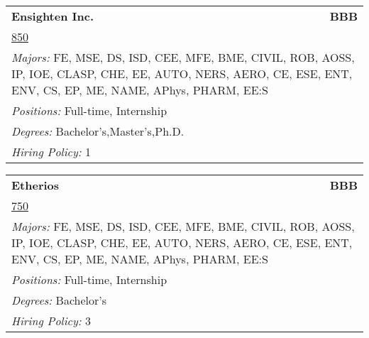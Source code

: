 \documentclass[twoside]{article}
\begin{document}
\begin{center}
\begin{multicols}{3}
\begin{FlushLeft}
\begin{minipage}{.9\columnwidth}
\end{minipage}
 
\begin{minipage}{.9\columnwidth}\begin{tabularx}{.95\columnwidth}{Xr}
                 {\Large\bf Ensighten Inc.} & {\Large\bf BBB}\\
    \multicolumn{2}{p{.95\columnwidth}}{\url{850}}\\
    \multicolumn{2}{p{.95\columnwidth}}{\emph{Majors:} FE, MSE, DS, ISD, CEE, MFE, BME, CIVIL, ROB, AOSS, IP, IOE, CLASP, CHE, EE, AUTO, NERS, AERO, CE, ESE, ENT, ENV, CS, EP, ME, NAME, APhys, PHARM, EE:S}\\
    \multicolumn{2}{p{.95\columnwidth}}{\emph{Positions:} Full-time, Internship}\\
    \multicolumn{2}{p{.95\columnwidth}}{\emph{Degrees:} Bachelor's,Master's,Ph.D.}\\
    \multicolumn{2}{p{.95\columnwidth}}{\emph{Hiring Policy:} 1}\\
    \end{tabularx}
    
\end{minipage}
 
\begin{minipage}{.9\columnwidth}\begin{tabularx}{.95\columnwidth}{Xr}
                 {\Large\bf Etherios} & {\Large\bf BBB}\\
    \multicolumn{2}{p{.95\columnwidth}}{\url{750}}\\
    \multicolumn{2}{p{.95\columnwidth}}{\emph{Majors:} FE, MSE, DS, ISD, CEE, MFE, BME, CIVIL, ROB, AOSS, IP, IOE, CLASP, CHE, EE, AUTO, NERS, AERO, CE, ESE, ENT, ENV, CS, EP, ME, NAME, APhys, PHARM, EE:S}\\
    \multicolumn{2}{p{.95\columnwidth}}{\emph{Positions:} Full-time, Internship}\\
    \multicolumn{2}{p{.95\columnwidth}}{\emph{Degrees:} Bachelor's}\\
    \multicolumn{2}{p{.95\columnwidth}}{\emph{Hiring Policy:} 3}\\
    \end{tabularx}
    
\end{minipage}
 

\end{FlushLeft}
\end{multicols}
\end{center}
\end{document}
